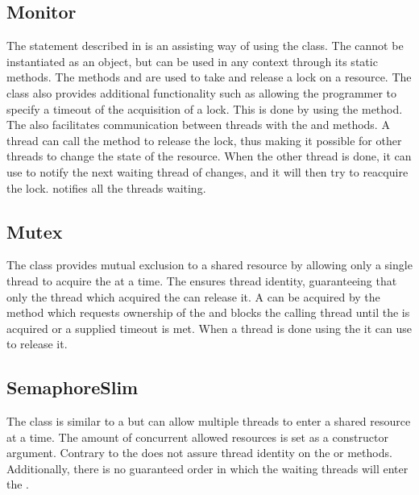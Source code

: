 \subsection{Monitor}
The  statement described in  is an assisting way of using the  class\cite{msdnMonitor}. The  cannot be instantiated as an object, but can be used in any context through its static methods. The methods  and  are used to take and release a lock on a resource. The  class also provides additional functionality such as allowing the programmer to specify a timeout of the acquisition of a lock. This is done by using the  method. The  also facilitates communication between threads with the   and  methods. A thread can call the  method to release the lock, thus making it possible for other threads to change the state of the resource. When the other thread is done, it can use  to notify the next waiting thread of changes, and it will then try to reacquire the lock.  notifies all the threads waiting.
\subsection{Mutex}
The  class\cite{msdnMutex} provides mutual exclusion to a shared resource by allowing only a single thread to acquire the  at a time. The  ensures thread identity,  guaranteeing that only the thread which acquired the  can release it. A  can be acquired by the method  which requests ownership of the  and blocks the calling thread until the  is acquired or a supplied timeout is met. When a thread is done using the  it can use  to release it.

\subsection{SemaphoreSlim}
The  class\cite{msdnSemaphoreSlim} is similar to a  but can allow multiple threads to enter a shared resource at a time. The amount of concurrent allowed resources is set as a constructor argument. Contrary to  the  does not assure thread identity on the  or  methods. Additionally, there is no guaranteed order in which the waiting threads will enter the . 

